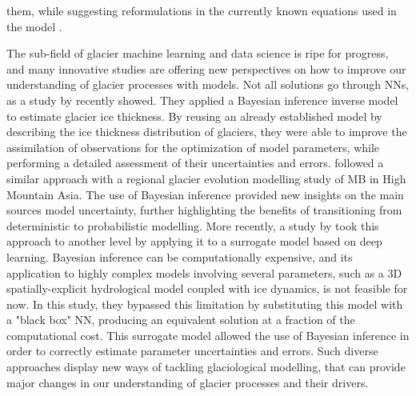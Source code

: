 them, while suggesting reformulations in the currently known equations used in the model \citep{rackauckas_universal_2020}. 

The sub-field of glacier machine learning and data science is ripe for progress, and many innovative studies are offering new perspectives on how to improve our understanding of glacier processes with models. Not all solutions go through NNs, as a study by \citet{werder_bayesian_2019} recently showed. They applied a Bayesian inference inverse model to estimate glacier ice thickness. By reusing an already established model by \citet{huss_distributed_2012} describing the ice thickness distribution of glaciers, they were able to improve the assimilation of observations for the optimization of model parameters, while performing a detailed assessment of their uncertainties and errors. \citet{rounce_quantifying_2020} followed a similar approach with a regional glacier evolution modelling study of MB in High Mountain Asia. The use of Bayesian inference provided new insights on the main sources model uncertainty, further highlighting the benefits of transitioning from deterministic to probabilistic modelling. More recently, a study by \citet{brinkerhoff_constraining_2020} took this approach to another level by applying it to a surrogate model based on deep learning. Bayesian inference can be computationally expensive, and its application to highly complex models involving several parameters, such as a 3D spatially-explicit hydrological model coupled with ice dynamics, is not feasible for now. In this study, they bypassed this limitation by substituting this model with a "black box" NN, producing an equivalent solution at a fraction of the computational cost. This surrogate model allowed the use of Bayesian inference in order to correctly estimate parameter uncertainties and errors. Such diverse approaches display new ways of tackling glaciological modelling, that can provide major changes in our understanding of glacier processes and their drivers. 

